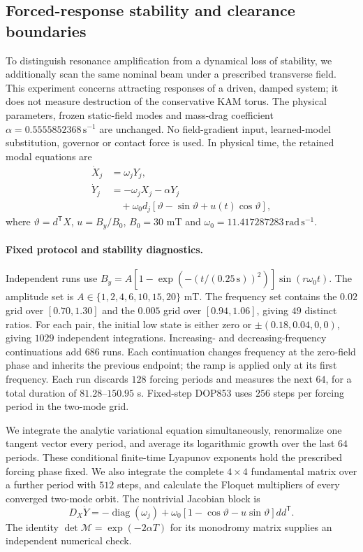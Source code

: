 \subsection{Forced-response stability and clearance boundaries}
\label{sec:stability-boundary}
To distinguish resonance amplification from a dynamical loss of stability,
we additionally scan the same nominal beam under a prescribed transverse
field. This experiment concerns attracting responses of a driven, damped
system; it does not measure destruction of the conservative KAM torus.
The physical parameters, frozen static-field modes and mass-drag coefficient
$\alpha=0.5555852368\,\mathrm{s}^{-1}$ are unchanged. No field-gradient
input, learned-model substitution, governor or contact force is used.
In physical time, the retained modal equations are
\begin{equation}
\begin{aligned}
 \dot X_j&=\omega_jY_j,\\
 \dot Y_j&=-\omega_jX_j-\alpha Y_j\\
 &\quad+\omega_0d_j[\vartheta-\sin\vartheta+u(t)\cos\vartheta],
\end{aligned}
\label{eq:boundary-modal-plant}
\end{equation}
where $\vartheta=d^{\mathsf T}X$, $u=B_y/B_0$, $B_0=30$ mT and
$\omega_0=11.417287283\,\mathrm{rad\,s^{-1}}$.

\paragraph{Fixed protocol and stability diagnostics.}
Independent runs use
$B_y=A[1-\exp(-(t/(0.25\,\mathrm{s}))^2)]\sin(r\omega_0t)$.
The amplitude set is $A\in\{1,2,4,6,10,15,20\}$ mT.
The frequency set contains the $0.02$ grid over $[0.70,1.30]$ and
the $0.005$ grid over $[0.94,1.06]$, giving $49$ distinct ratios.
For each pair, the initial low state is either zero or
$\pm(0.18,0.04,0,0)$, giving $1029$ independent integrations.
Increasing- and decreasing-frequency continuations add $686$ runs.
Each continuation changes frequency at the zero-field phase and inherits
the previous endpoint; the ramp is applied only at its first frequency.
Each run discards $128$ forcing periods and measures the next $64$,
for a total duration of $81.28$--$150.95$ s. Fixed-step DOP853 uses
$256$ steps per forcing period in the two-mode grid.

We integrate the analytic variational equation simultaneously, renormalize
one tangent vector every period, and average its logarithmic growth over
the last $64$ periods. These conditional finite-time Lyapunov exponents
hold the prescribed forcing phase fixed. We also integrate the complete
$4\times4$ fundamental matrix over a further period with $512$ steps,
and calculate the Floquet multipliers of every converged two-mode orbit.
The nontrivial Jacobian block is
\begin{equation}
 D_X\dot Y=-\operatorname{diag}(\omega_j)
 +\omega_0[1-\cos\vartheta-u\sin\vartheta]dd^{\mathsf T}.
\label{eq:boundary-variational-block}
\end{equation}
The identity $\det\mathcal M=\exp(-2\alpha T)$ for its monodromy
matrix supplies an independent numerical check.

